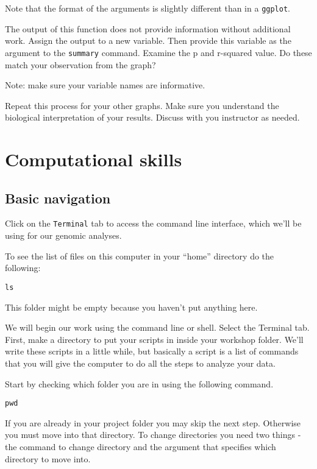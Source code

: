 \documentclass[
]{book}
\begin{document}
Note that the format of the arguments is slightly different than in a \texttt{ggplot}.

The output of this function does not provide information without additional work.
Assign the output to a new variable.
Then provide this variable as the argument to the \texttt{summary} command.
Examine the p and r-squared value.
Do these match your observation from the graph?

Note: make sure your variable names are informative.

Repeat this process for your other graphs. Make sure you understand the biological interpretation of your results. Discuss with you instructor as needed.

\hypertarget{computational-skills-1}{%
\chapter{Computational skills}\label{computational-skills-1}}

\hypertarget{basic-navigation}{%
\section{Basic navigation}\label{basic-navigation}}

Click on the \texttt{Terminal} tab to access the command line interface, which we'll be using for our genomic analyses.

To see the list of files on this computer in your ``home'' directory do the following:

\begin{verbatim}
ls
\end{verbatim}

This folder might be empty because you haven't put anything here.

We will begin our work using the command line or shell.
Select the Terminal tab.
First, make a directory to put your scripts in inside your workshop folder.
We'll write these scripts in a little while, but basically a script is a list of commands that you will give the computer to do all the steps to analyze your data.

Start by checking which folder you are in using the following command.

\begin{verbatim}
pwd
\end{verbatim}

If you are already in your project folder you may skip the next step.
Otherwise you must move into that directory.
To change directories you need two things - the command to change directory and the argument that specifies which directory to move into.
\end{document}
